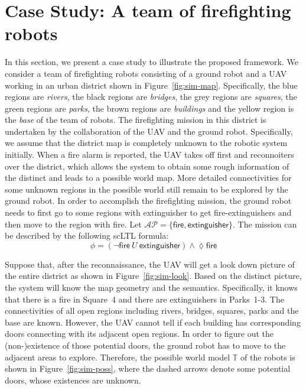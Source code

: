 \documentclass{ifacconf}
\def \AP{\mathcal{AP}}
\def \T{\mathbb{T}}
\begin{document}
 
 
\section{Case Study: A team of firefighting robots}\label{sec:case}

In this section, we present a case study to illustrate the proposed framework. 
We consider a team of firefighting robots consisting of a ground robot and a UAV working in an urban district shown in Figure~\ref{fig:sim-map}. 
Specifically,  the blue regions are  \emph{rivers}, the black regions are \emph{bridges}, 
the grey regions are \emph{squares},  the green regions are \emph{parks},
the brown regions are \emph{buildings} and the yellow region is the \emph{base} of the team of robots. 
The firefighting mission   in this district is undertaken by the collaboration of the UAV and the ground robot. Specifically, we assume that the district map is completely unknown to the robotic system initially. When a fire alarm is reported, the UAV takes off first and reconnoiters over the district, which allows the system to obtain some rough information of the distinct and leads to a possible world map. More detailed connectivities for some unknown regions in the possible world still remain to be explored by the ground robot. 
In  order to accomplish the firefighting mission, the ground robot needs to first go to some regions with \textsf{extinguisher} to get fire-extinguishers and then move to the region with \textsf{fire}. Let $\AP=\{\textsf{fire} , \textsf{extinguisher}\}$. The mission can be described by the following   scLTL formula:
\begin{equation}
 \phi= (\neg \textsf{fire} \ U\  \textsf{extinguisher})\wedge   \lozenge  \textsf{fire} 
\end{equation} 

Suppose that, after the reconnaissance, the UAV will get a look down picture of the entire district as shown in Figure~\ref{fig:sim-look}. 
Based on the distinct picture, the system will know the map geometry and the semantics. Specifically, it knows that there is a \textsf{fire} in Square~4 and there are \textsf{extinguishers} in Parks~1-3. The connectivities of all open regions including rivers, bridges, squares, parks and the base are known. However, the UAV cannot tell if each building has corresponding doors  connecting with its adjacent open regions.  In order to figure out the (non-)existence of those potential doors, the ground robot has to move to the adjacent areas to explore. Therefore, the possible world model $\T$ of the robots is shown in Figure~\ref{fig:sim-poss}, where the  dashed arrows denote some potential doors, whose existences are unknown. 
\end{document}
